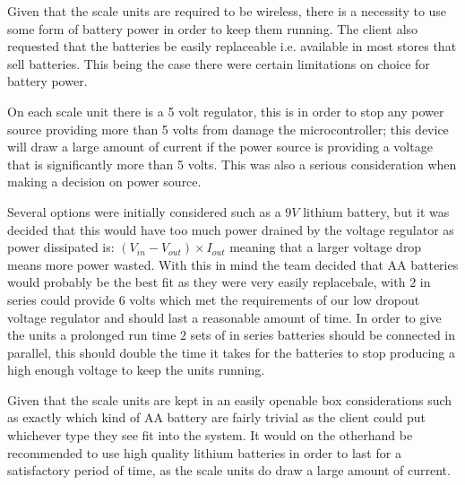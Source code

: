 Given that the scale units are required to be wireless, there is a necessity to use some form of battery power in order to keep them running. The client also requested that the batteries be easily replaceable i.e. available in most stores that sell batteries. This being the case there were certain limitations on choice for battery power. 

On each scale unit there is a 5 volt regulator, this is in order to stop any power source providing more than 5 volts from damage the microcontroller; this device will draw a large amount of current if the power source is providing a voltage that is significantly more than 5 volts. This was also a serious consideration when making a decision on power source.

Several options were initially considered such as a $9V$ lithium battery, but it was decided that this would have too much power drained by the voltage regulator as power dissipated is: $(V_{in} - V_{out}) \times I_{out}$ meaning that a larger voltage drop means more power wasted. With this in mind the team decided that AA batteries would probably be the best fit as they were very easily replacebale, with $2$ in series could provide 6 volts which met the requirements of our low dropout voltage regulator and should last a reasonable amount of time. In order to give the units a prolonged run time $2$ sets of in series batteries should be connected in parallel, this should double the time it takes for the batteries to stop producing a high enough voltage to keep the units running. 

Given that the scale units are kept in an easily openable box considerations such as exactly which kind of AA battery are fairly trivial as the client could put whichever type they see fit into the system. It would on the otherhand be recommended to use high quality lithium batteries in order to last for a satisfactory period of time, as the scale units do draw a large amount of current. 